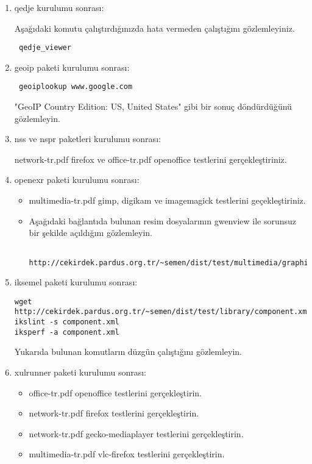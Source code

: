 \documentclass[a4paper,10pt]{article}
\begin{document}
\begin{enumerate}
\item qedje kurulumu sonrası:

Aşağıdaki komutu çalıştırdığınızda hata vermeden çalıştığını gözlemleyiniz.
\begin{verbatim}
 qedje_viewer
\end{verbatim}

\item geoip paketi kurulumu sonrası:
\begin{verbatim}
 geoiplookup www.google.com 
\end{verbatim}
"GeoIP Country Edition: US, United States" gibi bir sonuç döndürdüğünü gözlemleyin.

\item nss ve nspr paketleri kurulumu sonrası:

network-tr.pdf firefox ve office-tr.pdf openoffice testlerini gerçekleştiriniz.

\item openexr paketi kurulumu sonrası:
\begin{itemize}
 \item multimedia-tr.pdf gimp, digikam ve imagemagick testlerini geçekleştiriniz.
 \item Aşağıdaki bağlantıda bulunan resim dosyalarının gwenview ile sorunsuz bir şekilde açıldığını gözlemleyin.
  \begin{verbatim}
   http://cekirdek.pardus.org.tr/~semen/dist/test/multimedia/graphics/graphics.tar
  \end{verbatim}
\end{itemize}
\item iksemel paketi kurulumu sonrası:
\begin{verbatim}
wget http://cekirdek.pardus.org.tr/~semen/dist/test/library/component.xml
ikslint -s component.xml
iksperf -a component.xml 
\end{verbatim}

Yukarıda bulunan komutların düzgün çalıştığını gözlemleyin.

\item xulrunner paketi kurulumu sonrası:
\begin{itemize}
\item office-tr.pdf openoffice testlerini gerçekleştirin.
\item network-tr.pdf firefox testlerini gerçekleştirin.
\item network-tr.pdf gecko-mediaplayer testlerini gerçekleştirin.
\item multimedia-tr.pdf vlc-firefox testlerini gerçekleştirin.
\end{itemize}


\end{enumerate}
\end{document}
